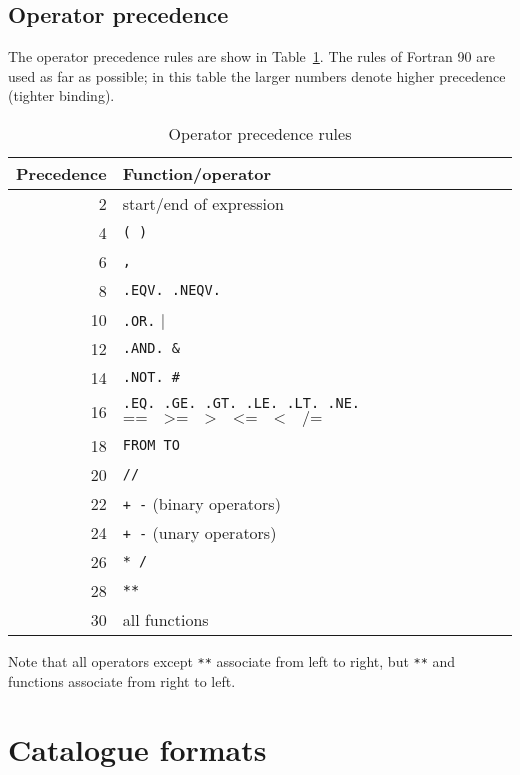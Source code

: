\documentclass[11pt,twoside]{starlink}
\begin{document}
\subsection{Operator precedence}

The operator precedence rules are show in Table~\ref{PREC}. The rules
of Fortran 90 are used as far as possible; in this table the larger
numbers denote higher precedence (tighter binding).

\begin{table}[htbp]

\begin{center}
\begin{tabular}{rl}
Precedence  & Function/operator  \\ \hline
  2 & start/end of expression  \\
  4 & \texttt{(  )}  \\
  6 & \texttt{,}  \\
  8 & \texttt{.EQV.  .NEQV.}  \\
 10 & \texttt{.OR.}   $\texttt{|}$  \\
 12 & \texttt{.AND.  \&} \\
 14 & \texttt{.NOT.  \#}  \\
 16 & \texttt{.EQ. .GE. .GT. .LE. .LT. .NE.} $\texttt{== ~ >= ~ > ~ <= ~ < ~ /=}$ \\
 18 & \texttt{FROM  TO}  \\
 20 & \texttt{//}  \\
 22 & \texttt{+ -} (binary operators)  \\
 24 & \texttt{+ -} (unary operators)  \\
 26 & \texttt{* /}  \\
 28 & \texttt{**}  \\
 30 & all functions  \\
\end{tabular}
\end{center}

\caption{\label{PREC}Operator precedence rules}

\end{table}


Note that all operators except \texttt{**} associate from left to right, but
\texttt{**} and functions associate from right to left.


\newpage
\section{\label{FORMAT}Catalogue formats}
\end{document}
